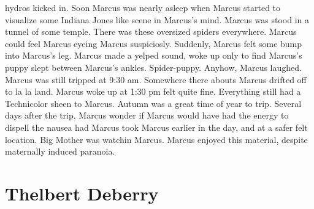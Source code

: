 \documentclass[12pt]{book}
\begin{document}
hydros kicked in. Soon Marcus was nearly asleep when Marcus started to visualize some Indiana Jones like scene in Marcus's mind. Marcus was stood in a tunnel of some temple. There was these oversized spiders everywhere. Marcus could feel Marcus eyeing Marcus suspiciosly. Suddenly, Marcus felt some bump into Marcus's leg. Marcus made a yelped sound, woke up only to find Marcus's puppy slept between Marcus's ankles. Spider-puppy. Anyhow, Marcus laughed. Marcus was still tripped at 9:30 am. Somewhere there abouts Marcus drifted off to la la land. Marcus woke up at 1:30 pm felt quite fine. Everything still had a Technicolor sheen to Marcus. Autumn was a great time of year to trip. Several days after the trip, Marcus wonder if Marcus would have had the energy to dispell the nausea had Marcus took Marcus earlier in the day, and at a safer felt location. Big Mother was watchin Marcus. Marcus enjoyed this material, despite maternally induced paranoia.



\chapter{Thelbert Deberry}
\end{document}
